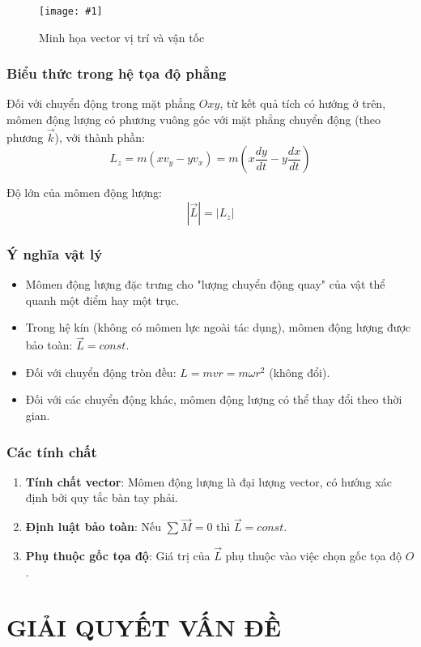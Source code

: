 \documentclass{report}
\newcommand{\insertimage}[3]{%
    \begin{figure}[!htbp]
        \centering
        \texttt{[image: \#1]}
        \caption{#3}
        \label{fig:#1}
    \end{figure}
}
\begin{document}
\insertimage{pictures/minh_hoa_khai_niem}{0.7}{Minh họa vector vị trí và vận tốc}

\subsection{Biểu thức trong hệ tọa độ phẳng}
Đối với chuyển động trong mặt phẳng $Oxy$, từ kết quả tích có hướng ở trên, mômen động lượng có phương vuông góc với mặt phẳng chuyển động (theo phương $\vec{k}$), với thành phần:
\begin{equation}
L_z = m(xv_y - yv_x) = m\left(x\frac{dy}{dt} - y\frac{dx}{dt}\right)
\label{eq:momen}
\end{equation}

Độ lớn của mômen động lượng:
\[|\vec{L}| = |L_z|\]

\subsection{Ý nghĩa vật lý}
\begin{itemize}
    \item Mômen động lượng đặc trưng cho "lượng chuyển động quay" của vật thể quanh một điểm hay một trục.
    \item Trong hệ kín (không có mômen lực ngoài tác dụng), mômen động lượng được bảo toàn: $\vec{L} = const$.
    \item Đối với chuyển động tròn đều: $L = mvr = m\omega r^2$ (không đổi).
    \item Đối với các chuyển động khác, mômen động lượng có thể thay đổi theo thời gian.
\end{itemize}

\subsection{Các tính chất}
\begin{enumerate}
    \item \textbf{Tính chất vector}: Mômen động lượng là đại lượng vector, có hướng xác định bởi quy tắc bàn tay phải.
    \item \textbf{Định luật bảo toàn}: Nếu $\sum \vec{M} = 0$ thì $\vec{L} = const$.
    \item \textbf{Phụ thuộc gốc tọa độ}: Giá trị của $\vec{L}$ phụ thuộc vào việc chọn gốc tọa độ $O$.
\end{enumerate}

\chapter{GIẢI QUYẾT VẤN ĐỀ}
\end{document}
